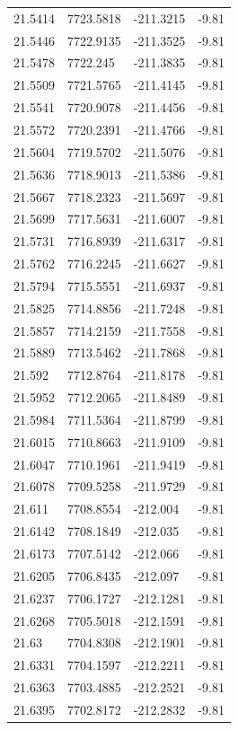 \begin{table}[H]
\begin{tabular}{llll}
21.5414 & 7723.5818 & -211.3215 & -9.81 \\
21.5446 & 7722.9135 & -211.3525 & -9.81 \\
21.5478 & 7722.245 & -211.3835 & -9.81 \\
21.5509 & 7721.5765 & -211.4145 & -9.81 \\
21.5541 & 7720.9078 & -211.4456 & -9.81 \\
21.5572 & 7720.2391 & -211.4766 & -9.81 \\
21.5604 & 7719.5702 & -211.5076 & -9.81 \\
21.5636 & 7718.9013 & -211.5386 & -9.81 \\
21.5667 & 7718.2323 & -211.5697 & -9.81 \\
21.5699 & 7717.5631 & -211.6007 & -9.81 \\
21.5731 & 7716.8939 & -211.6317 & -9.81 \\
21.5762 & 7716.2245 & -211.6627 & -9.81 \\
21.5794 & 7715.5551 & -211.6937 & -9.81 \\
21.5825 & 7714.8856 & -211.7248 & -9.81 \\
21.5857 & 7714.2159 & -211.7558 & -9.81 \\
21.5889 & 7713.5462 & -211.7868 & -9.81 \\
21.592 & 7712.8764 & -211.8178 & -9.81 \\
21.5952 & 7712.2065 & -211.8489 & -9.81 \\
21.5984 & 7711.5364 & -211.8799 & -9.81 \\
21.6015 & 7710.8663 & -211.9109 & -9.81 \\
21.6047 & 7710.1961 & -211.9419 & -9.81 \\
21.6078 & 7709.5258 & -211.9729 & -9.81 \\
21.611 & 7708.8554 & -212.004 & -9.81 \\
21.6142 & 7708.1849 & -212.035 & -9.81 \\
21.6173 & 7707.5142 & -212.066 & -9.81 \\
21.6205 & 7706.8435 & -212.097 & -9.81 \\
21.6237 & 7706.1727 & -212.1281 & -9.81 \\
21.6268 & 7705.5018 & -212.1591 & -9.81 \\
21.63 & 7704.8308 & -212.1901 & -9.81 \\
21.6331 & 7704.1597 & -212.2211 & -9.81 \\
21.6363 & 7703.4885 & -212.2521 & -9.81 \\
21.6395 & 7702.8172 & -212.2832 & -9.81 \\

\end{tabular}
\end{table}
